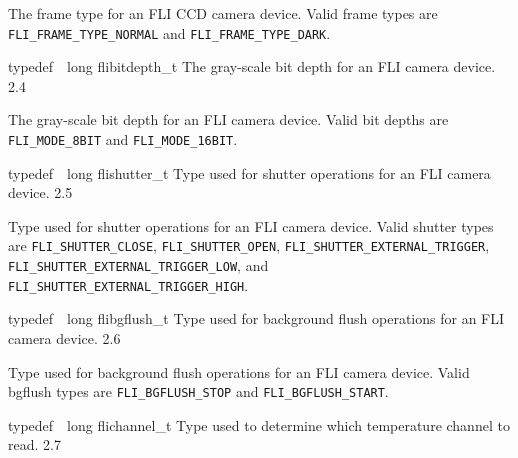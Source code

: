 \documentclass{article}
\begin{document}
\begin{cxxentry}
\begin{cxxentry}
\begin{cxxdoc}
The frame type for an FLI CCD camera device.  Valid frame types are
\texttt{FLI\_FRAME\_TYPE\_NORMAL} and \texttt{FLI\_FRAME\_TYPE\_DARK}.


\end{cxxdoc}
\end{cxxentry}
\begin{cxxentry}
{typedef\ \ long}
        {flibitdepth\_t}
        {}
        { The gray-scale bit depth for an FLI camera device.}
        {2.4}
\begin{cxxdoc}

The gray-scale bit depth for an FLI camera device.  Valid bit
depths are \texttt{FLI\_MODE\_8BIT} and \texttt{FLI\_MODE\_16BIT}.


\end{cxxdoc}
\end{cxxentry}
\begin{cxxentry}
{typedef\ \ long}
        {flishutter\_t}
        {}
        { Type used for shutter operations for an FLI camera device.}
        {2.5}
\begin{cxxdoc}

Type used for shutter operations for an FLI camera device.  Valid
shutter types are \texttt{FLI\_SHUTTER\_CLOSE},
\texttt{FLI\_SHUTTER\_OPEN},
\texttt{FLI\_SHUTTER\_EXTERNAL\_TRIGGER},
\texttt{FLI\_SHUTTER\_EXTERNAL\_TRIGGER\_LOW}, and
\texttt{FLI\_SHUTTER\_EXTERNAL\_TRIGGER\_HIGH}.


\end{cxxdoc}
\end{cxxentry}
\begin{cxxentry}
{typedef\ \ long}
        {flibgflush\_t}
        {}
        { Type used for background flush operations for an FLI camera device.}
        {2.6}
\begin{cxxdoc}

Type used for background flush operations for an FLI camera device.  Valid
bgflush types are \texttt{FLI\_BGFLUSH\_STOP} and
\texttt{FLI\_BGFLUSH\_START}.


\end{cxxdoc}
\end{cxxentry}
\begin{cxxentry}
{typedef\ \ long}
        {flichannel\_t}
        {}
        { Type used to determine which temperature channel to read.}
        {2.7}
\begin{cxxdoc}


\end{cxxdoc}
\end{cxxentry}
\end{cxxentry}
\end{document}

